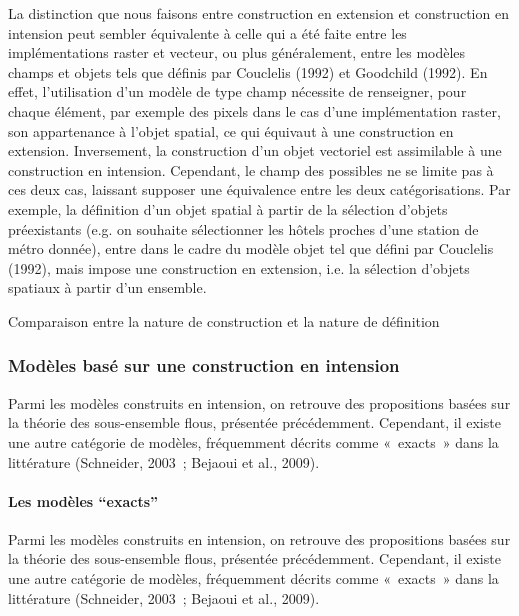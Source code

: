 La distinction que nous faisons entre construction en extension et
construction en intension peut sembler équivalente à celle qui a été
faite entre les implémentations raster et vecteur, ou plus
généralement, entre les modèles champs et objets tels que définis par
Couclelis (1992) et Goodchild (1992). En effet, l’utilisation d’un
modèle de type champ nécessite de renseigner, pour chaque élément, par
exemple des pixels dans le cas d’une implémentation raster, son
appartenance à l’objet spatial, ce qui équivaut à une construction en
extension. Inversement, la construction d’un objet vectoriel est
assimilable à une construction en intension. Cependant, le champ des
possibles ne se limite pas à ces deux cas, laissant supposer une
équivalence entre les deux catégorisations. Par exemple, la définition
d’un objet spatial à partir de la sélection d’objets préexistants
(e.g. on souhaite sélectionner les hôtels proches d’une station de
métro donnée), entre dans le cadre du modèle objet tel que défini par
Couclelis (1992), mais impose une construction en extension, i.e. la
sélection d’objets spatiaux à partir d’un ensemble.

\begin{table}
  \centering
  
  \caption{Comparaison entre la nature de construction et la nature de définition}
  \label{tab:ext_vs_int}
\end{table}

\subsubsection{Modèles basé sur une construction en intension}

Parmi les modèles construits en intension, on retrouve des
propositions basées sur la théorie des sous-ensemble flous, présentée
précédemment. Cependant, il existe une autre catégorie de modèles,
fréquemment décrits comme « exacts » dans la littérature (Schneider,
2003 ; Bejaoui et al., 2009).

\paragraph{Les modèles \enquote{exacts}}


Parmi les modèles construits en intension, on retrouve des
propositions basées sur la théorie des sous-ensemble flous, présentée
précédemment. Cependant, il existe une autre catégorie de modèles,
fréquemment décrits comme « exacts » dans la littérature (Schneider,
2003 ; Bejaoui et al., 2009).

